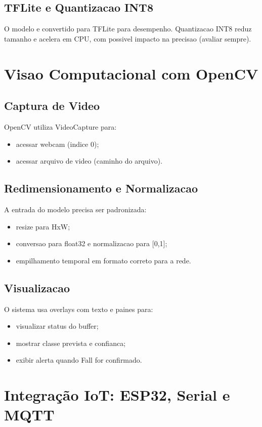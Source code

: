\subsection{TFLite e Quantizacao INT8}
O modelo e convertido para TFLite para desempenho. Quantizacao INT8 reduz tamanho e acelera em CPU, com possivel impacto na precisao (avaliar sempre).

\section{Visao Computacional com OpenCV}

\subsection{Captura de Video}
OpenCV utiliza VideoCapture para:
\begin{itemize}
  \item acessar webcam (indice 0);
  \item acessar arquivo de video (caminho do arquivo).
\end{itemize}

\subsection{Redimensionamento e Normalizacao}
A entrada do modelo precisa ser padronizada:
\begin{itemize}
  \item resize para HxW;
  \item conversao para float32 e normalizacao para [0,1];
  \item empilhamento temporal em formato correto para a rede.
\end{itemize}

\subsection{Visualizacao}
O sistema usa overlays com texto e paines para:
\begin{itemize}
  \item visualizar status do buffer;
  \item mostrar classe prevista e confianca;
  \item exibir alerta quando Fall for confirmado.
\end{itemize}

\section{Integração IoT: ESP32, Serial e MQTT}

